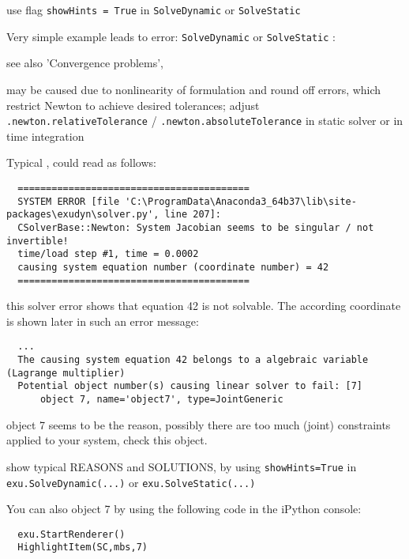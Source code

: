 \bi
\item[$\ra$] use flag \texttt{showHints = True} in \texttt{SolveDynamic} or \texttt{SolveStatic}
\ei
\item Very simple example  leads to error: \texttt{SolveDynamic} or \texttt{SolveStatic} :
\bi
\item[$\ra$] see also 'Convergence problems', 
\item[$\ra$] may be caused due to nonlinearity of formulation and round off errors, which restrict Newton to achieve desired tolerances; adjust  \texttt{.newton.relativeTolerance} / \texttt{.newton.absoluteTolerance} in static solver or in time integration
\ei
\item Typical , could read as follows:
\begin{lstlisting}
  =========================================
  SYSTEM ERROR [file 'C:\ProgramData\Anaconda3_64b37\lib\site-packages\exudyn\solver.py', line 207]: 
  CSolverBase::Newton: System Jacobian seems to be singular / not invertible!
  time/load step #1, time = 0.0002
  causing system equation number (coordinate number) = 42
  =========================================
\end{lstlisting}
%
\bi
\item[$\ra$] this solver error shows that equation 42 is not solvable. The according coordinate is shown later in such an error message:
\ei
\begin{lstlisting}
  ...
  The causing system equation 42 belongs to a algebraic variable (Lagrange multiplier)
  Potential object number(s) causing linear solver to fail: [7]
      object 7, name='object7', type=JointGeneric
\end{lstlisting}
%
\bi
\item[$\ra$] object 7 seems to be the reason, possibly there are too much (joint) constraints applied to your system, check this object.
\item[$\ra$] show typical REASONS and SOLUTIONS, by using \texttt{showHints=True} in \texttt{exu.SolveDynamic(...)} or \texttt{exu.SolveStatic(...)}
\item[$\ra$] You can also  object 7 by using the following code in the iPython console:
\ei
\pythonstyle\begin{lstlisting}
  exu.StartRenderer()
  HighlightItem(SC,mbs,7)
\end{lstlisting}

